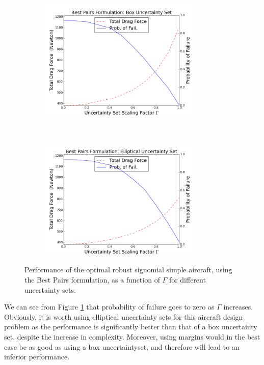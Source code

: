 \begin{figure}[ht]
    \centering
    \captionsetup{justification=centering, font=small}
    \begin{subfigure}{0.49\textwidth}
        \centering
        \includegraphics[height=2.3in]{signomial_simple_flight/box_best_pairs.png}
    \end{subfigure}%
    ~ 
    \begin{subfigure}{0.49\textwidth}
        \centering
        \includegraphics[height=2.3in]{signomial_simple_flight/ell_best_pairs.png}
    \end{subfigure}
    \caption{Performance of the optimal robust signomial simple aircraft, using the Best Pairs formulation, as a function of $\Gamma$ for different uncertainty sets.}
    \label{signomial_var_gamma}
\end{figure}

We can see from Figure \ref{signomial_var_gamma} that probability of failure goes to zero as $\Gamma$ increases. 
Obviously, it is worth using elliptical uncertainty sets for this aircraft design problem as the performance is significantly better than that of a box uncertainty set, despite the increase in complexity. 
Moreover, using margins would in the best case be as good as using a box uncertaintyset, and therefore will lead to an inferior performance.

